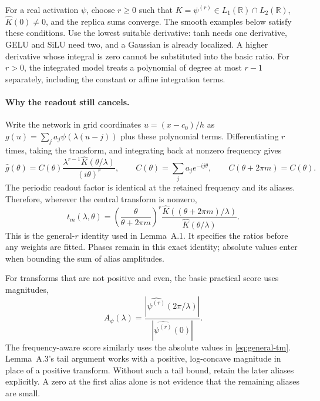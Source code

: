 \documentclass[11pt]{article}
\begin{document}
For a real activation $\psi$, choose $r\ge0$ such that
$K=\psi^{(r)}\in L_1(\mathbb R)\cap L_2(\mathbb R)$,
$\widehat K(0)\ne0$, and the replica sums converge. The smooth examples below
satisfy these conditions. Use the lowest suitable derivative: tanh needs one
derivative, GELU and SiLU need two, and a Gaussian is already localized.
A higher derivative whose integral is zero cannot be substituted into the
basic ratio. For $r>0$, the integrated model treats a polynomial of degree at
most $r-1$ separately, including the constant or affine integration terms.

\paragraph{Why the readout still cancels.}
Write the network in grid coordinates $u=(x-c_0)/h$ as
$g(u)=\sum_j a_j\psi(\lambda(u-j))$ plus these polynomial terms.
Differentiating $r$ times, taking the transform, and integrating back at
nonzero frequency gives
\begin{equation}
\widehat g(\theta)=C(\theta)
\frac{\lambda^{r-1}\widehat K(\theta/\lambda)}{(i\theta)^r},
\qquad C(\theta)=\sum_j a_je^{-ij\theta},
\qquad C(\theta+2\pi m)=C(\theta).
\label{eq:general-transfer}
\end{equation}
The periodic readout factor is identical at the retained frequency and its
aliases. Therefore, wherever the central transform is nonzero,
\begin{equation}
 t_m(\lambda,\theta)=
 \left(\frac{\theta}{\theta+2\pi m}\right)^r
 \frac{\widehat K((\theta+2\pi m)/\lambda)}{\widehat K(\theta/\lambda)}.
\label{eq:general-tm}
\end{equation}
This is the general-$r$ identity used in Lemma~A.1. It specifies the ratios
before any weights are fitted. Phases remain in this exact identity; absolute
values enter when bounding the sum of alias amplitudes.

For transforms that are not positive and even, the basic practical score uses
magnitudes,
\begin{equation}
 A_\psi(\lambda)=
 \frac{|\widehat{\psi^{(r)}}(2\pi/\lambda)|}
 {|\widehat{\psi^{(r)}}(0)|}.
\label{eq:general-basic}
\end{equation}
The frequency-aware score similarly uses the absolute values in
\eqref{eq:general-tm}. Lemma~A.3's tail argument works with a positive,
log-concave magnitude in place of a positive transform. Without such a tail
bound, retain the later aliases explicitly. A zero at the first alias alone
is not evidence that the remaining aliases are small.
\end{document}
